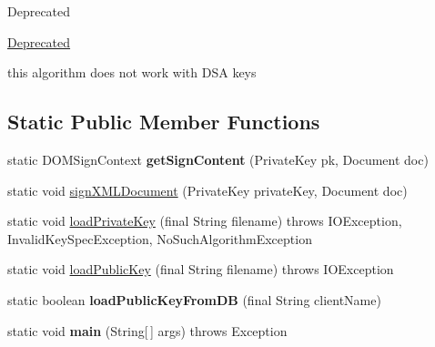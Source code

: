 \begin{DoxyRefDesc}{Deprecated}
\item[\hyperlink{deprecated__deprecated000016}{Deprecated}]
\begin{DoxyItemize}
\item this algorithm does not work with D\-S\-A keys 
\end{DoxyItemize}\end{DoxyRefDesc}
\subsection*{Static Public Member Functions}
\begin{DoxyCompactItemize}
\item 
\hypertarget{classgov_1_1fnal_1_1ppd_1_1ZZattic_1_1GenEnveloped_a69be7eea0c284cf04dc66e76138895a8}{static D\-O\-M\-Sign\-Context {\bfseries get\-Sign\-Content} (Private\-Key pk, Document doc)}\label{classgov_1_1fnal_1_1ppd_1_1ZZattic_1_1GenEnveloped_a69be7eea0c284cf04dc66e76138895a8}

\item 
static void \hyperlink{classgov_1_1fnal_1_1ppd_1_1ZZattic_1_1GenEnveloped_aa8e572349a537781033c6e6313e49dbb}{sign\-X\-M\-L\-Document} (Private\-Key private\-Key, Document doc)
\item 
static void \hyperlink{classgov_1_1fnal_1_1ppd_1_1ZZattic_1_1GenEnveloped_a80d09b491d9a3a3c64651101e5510065}{load\-Private\-Key} (final String filename)  throws I\-O\-Exception, Invalid\-Key\-Spec\-Exception, No\-Such\-Algorithm\-Exception 
\item 
static void \hyperlink{classgov_1_1fnal_1_1ppd_1_1ZZattic_1_1GenEnveloped_abf95b0c7110d6a16d5329e91606475de}{load\-Public\-Key} (final String filename)  throws I\-O\-Exception 
\item 
\hypertarget{classgov_1_1fnal_1_1ppd_1_1ZZattic_1_1GenEnveloped_a303d48c06a4ed04baa8d16799f4fc8a0}{static boolean {\bfseries load\-Public\-Key\-From\-D\-B} (final String client\-Name)}\label{classgov_1_1fnal_1_1ppd_1_1ZZattic_1_1GenEnveloped_a303d48c06a4ed04baa8d16799f4fc8a0}

\item 
\hypertarget{classgov_1_1fnal_1_1ppd_1_1ZZattic_1_1GenEnveloped_a46554c2e6c56eb3fa74c7a794ced385e}{static void {\bfseries main} (String\mbox{[}$\,$\mbox{]} args)  throws Exception }\label{classgov_1_1fnal_1_1ppd_1_1ZZattic_1_1GenEnveloped_a46554c2e6c56eb3fa74c7a794ced385e}

\end{DoxyCompactItemize}


